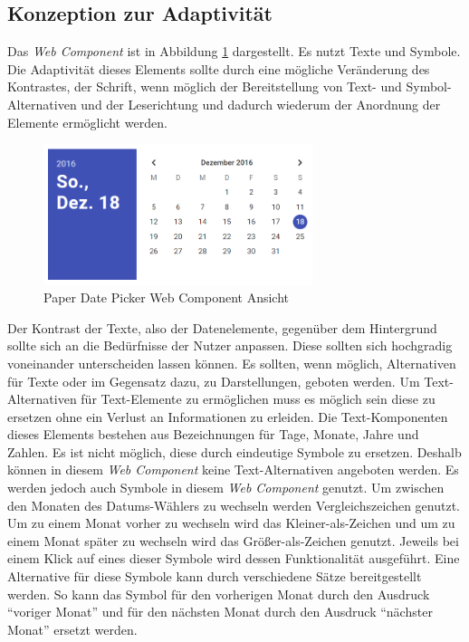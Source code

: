 \documentclass[12pt, paper=a4, bibtotoc, toc=listof, headsepline=true, numbers=endperiod]{scrreprt}
\begin{document}
		\subsection{Konzeption zur Adaptivität}
		Das \emph{Web Component} ist in Abbildung \ref{img:datPic} dargestellt.
		Es nutzt Texte und Symbole. Die Adaptivität dieses Elements sollte durch eine mögliche Veränderung des Kontrastes, der Schrift, wenn möglich der Bereitstellung von Text- und Symbol-Alternativen und der Leserichtung und dadurch wiederum der Anordnung der Elemente ermöglicht werden.
		\begin{figure}[H]		
			\centering
			\includegraphics[width=0.7\textwidth,height=\textheight,keepaspectratio]{datPic.png}
			\caption[Paper Date Picker]{Paper Date Picker Web Component Ansicht \cite{papDatPicGit}}
			\label{img:datPic}
		\end{figure}\noindent
		Der Kontrast der Texte, also der Datenelemente, gegenüber dem Hintergrund sollte sich an die Bedürfnisse der Nutzer anpassen. Diese sollten sich hochgradig voneinander unterscheiden lassen können. 
		Es sollten, wenn möglich, Alternativen für Texte oder im Gegensatz dazu, zu Darstellungen, geboten werden. Um Text-Alternativen für Text-Elemente zu ermöglichen muss es möglich sein diese zu ersetzen ohne ein Verlust an Informationen zu erleiden. Die Text-Komponenten dieses Elements bestehen aus Bezeichnungen für Tage, Monate, Jahre und Zahlen. Es ist nicht möglich, diese durch eindeutige Symbole zu ersetzen. Deshalb können in diesem \emph{Web Component} keine Text-Alternativen angeboten werden. Es werden jedoch auch Symbole in diesem \emph{Web Component} genutzt. Um zwischen den Monaten des Datums-Wählers zu wechseln werden Vergleichszeichen genutzt. Um zu einem Monat vorher zu wechseln wird das Kleiner-als-Zeichen und um zu einem Monat später zu wechseln wird das Größer-als-Zeichen genutzt. Jeweils bei einem Klick auf eines dieser Symbole wird dessen Funktionalität ausgeführt. Eine Alternative für diese Symbole kann durch verschiedene Sätze bereitgestellt werden. So kann das Symbol für den vorherigen Monat durch den Ausdruck \enquote{voriger Monat} und für den nächsten Monat durch den Ausdruck \enquote{nächster Monat} ersetzt werden.
\end{document}
